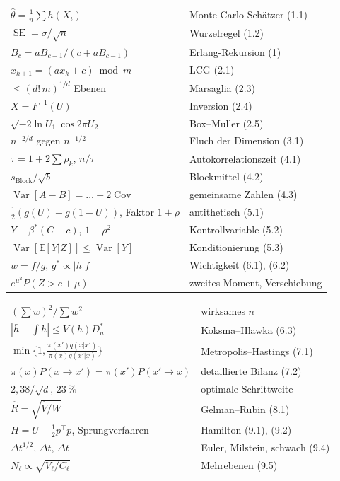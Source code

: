 \begin{merksatz}
\begin{center}
{\small
\renewcommand{\arraystretch}{1.6}
\begin{tabular}{@{}P{4.6cm}P{4.0cm}@{}}
\toprule
$\hat\theta = \frac1n\sum h(X_i)$ & Monte-Carlo-Schätzer (1.1)\\
$\operatorname{SE} = \sigma/\sqrt n$ & Wurzelregel (1.2)\\
$B_c = aB_{c-1}/(c+aB_{c-1})$ & Erlang-Rekursion (1)\\
$x_{k+1} = (ax_k+c)\bmod m$ & LCG (2.1)\\
$\le (d!\,m)^{1/d}$ Ebenen & Marsaglia (2.3)\\
$X = F^{-1}(U)$ & Inversion (2.4)\\
$\sqrt{-2\ln U_1}\cos 2\pi U_2$ & Box--Muller (2.5)\\
$n^{-2/d}$ gegen $n^{-1/2}$ & Fluch der Dimension (3.1)\\
$\tau = 1+2\sum\rho_k$, $n/\tau$ & Autokorrelationszeit (4.1)\\
$s_{\text{Block}}/\sqrt b$ & Blockmittel (4.2)\\
$\operatorname{Var}[A-B] = \ldots - 2\operatorname{Cov}$ & gemeinsame Zahlen (4.3)\\
$\tfrac12(g(U)+g(1-U))$, Faktor $1+\rho$ & antithetisch (5.1)\\
$Y-\beta^*(C-c)$, $1-\rho^2$ & Kontrollvariable (5.2)\\
$\operatorname{Var}[\mathbb E[Y|Z]]\le\operatorname{Var}[Y]$ & Konditionierung (5.3)\\
$w = f/g$, $g^*\propto|h|f$ & Wichtigkeit (6.1), (6.2)\\
$e^{\mu^2}P(Z>c+\mu)$ & zweites Moment, Verschiebung\\
\bottomrule
\end{tabular}}
\end{center}
\begin{center}
{\small
\renewcommand{\arraystretch}{1.6}
\begin{tabular}{@{}P{4.6cm}P{4.0cm}@{}}
\toprule
$(\sum w)^2/\sum w^2$ & wirksames $n$\\
$|\bar h - \int h| \le V(h)D^*_n$ & Koksma--Hlawka (6.3)\\
$\min\{1, \tfrac{\pi(x')q(x|x')}{\pi(x)q(x'|x)}\}$ & Metropolis--Hastings (7.1)\\
$\pi(x)P(x\to x') = \pi(x')P(x'\to x)$ & detaillierte Bilanz (7.2)\\
$2{,}38/\sqrt d$, $23\,\%$ & optimale Schrittweite\\
$\hat R = \sqrt{\hat V/W}$ & Gelman--Rubin (8.1)\\
$H = U + \tfrac12 p^\top p$, Sprungverfahren & Hamilton (9.1), (9.2)\\
$\Delta t^{1/2}$, $\Delta t$, $\Delta t$ & Euler, Milstein, schwach (9.4)\\
$N_\ell\propto\sqrt{V_\ell/C_\ell}$ & Mehrebenen (9.5)\\
\bottomrule
\end{tabular}}
\end{center}
\end{merksatz}

